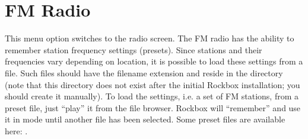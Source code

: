 \section{\label{ref:FMradio}FM Radio}

  This menu option switches to the radio screen.
  The FM radio has the ability to remember station frequency settings
  (presets). Since stations and their frequencies vary depending on location,
  it is possible to load these settings from a file. Such files should have
  the filename extension  and reside in the directory
   (note that this directory does not exist after
  the initial Rockbox installation; you should create it manually). To load
  the settings, i.e. a set of FM stations, from a preset file, just ``play''
  it from the file browser. Rockbox will ``remember'' and use it in
   mode until another file has been selected. Some preset
  files are available here: .



